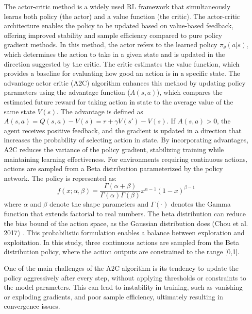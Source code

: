 \documentclass[preprint,12pt]{elsarticle}
\begin{document}
The actor-critic method is a widely used RL framework that simultaneously learns both policy (the actor) and a value function (the critic). The actor-critic architecture enables the policy to be updated based on value-based feedback, offering improved stability and sample efficiency compared to pure policy gradient methods. In this method, the actor refers to the learned policy $\pi_\theta(a|s)$, which determines the action to take in a given state and is updated in the direction suggested by the critic. The critic estimates the value function, which provides a baseline for evaluating how good an action is in a specific state. The advantage actor critic (A2C) algorithm enhances this method by updating policy parameters using the advantage function ($A(s,a)$), which compares the estimated future reward for taking action in state to the average value of the same state $V(s)$. The advantage is defined as $A(s,a)=Q(s,a) - V(s)=r+\gamma V(s')-V(s)$. If $A(s,a) > 0$, the agent receives positive feedback, and the gradient is updated in a direction that increases the probability of selecting action in state. By incorporating advantages, A2C reduces the variance of the policy gradient, stabilizing training while maintaining learning effectiveness. For environments requiring continuous actions, actions are sampled from a Beta distribution parameterized by the policy network. The policy is represented as: 
\begin{equation}
    f(x;\alpha,\beta)=\frac{\Gamma(\alpha+\beta)}{\Gamma(\alpha)\Gamma(\beta)}x^{\alpha-1}(1-x)^{\beta-1}
\end{equation}
where $\alpha$ and $\beta$ denote the shape parameters and $\Gamma(\cdot)$ denotes the Gamma function that extends factorial to real numbers. The beta distribution can reduce the bias bound of the action space, as the Gaussian distribution does (Chou et al. 2017) \cite{Chou2017}. This probabilistic formulation enables a balance between exploration and exploitation. In this study, three continuous actions are sampled from the Beta distribution policy, where the action outputs are constrained to the range [0,1]. 

One of the main challenges of the A2C algorithm is its tendency to update the policy aggressively after every step, without applying thresholds or constraints to the model parameters. This can lead to instability in training, such as vanishing or exploding gradients, and poor sample efficiency, ultimately resulting in convergence issues.
\end{document}
